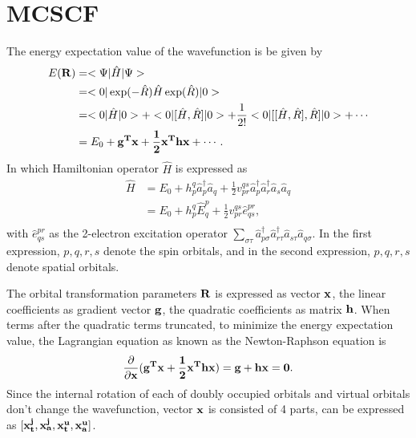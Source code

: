 \documentclass[a4paper,12pt,oneside]{book}
\begin{document}
\section{MCSCF}
The energy expectation value of the wavefunction is be given by
\begin{equation}
\begin{aligned}
E(\bf{R}) &= <\Psi|\hat{H}|\Psi> \\
&= <0|\exp(-\hat{R})\hat{H}\exp(\hat{R})|0> \\
&= <0|\hat{H}|0> + <0|[\hat{H},\hat{R}]|0> + \frac{1}{2!}< 0|[[\hat{H},\hat{R}], \hat{R}]|0> + \cdots\\
&= E_0+\bf{g}^T\bf{x} +\frac{1}{2} \bf{x}^T\bf{hx}+ \cdots.\\
\end{aligned}
\end{equation}
In which Hamiltonian operator $\hat{H}$ is expressed as
\begin{equation}
\begin{aligned}
\hat{H} &= E_0 + h^q_p\hat{a}_p^\dagger\hat{a}_q + \frac{1}{2}v^{qs}_{pr}\hat{a}_p^\dagger\hat{a}_r^\dagger\hat{a}_s\hat{a}_q\\
&= E_0 + h^q_p\hat{E}^p_q + \frac{1}{2}v^{qs}_{pr}\hat{e}^{pr}_{qs},\\
\end{aligned}
\end{equation}
with $\hat{e}^{pr}_{qs}$ as the 2-electron excitation operator $\sum_{\sigma\tau}\hat{a}_{p\sigma}^\dagger\hat{a}_{r\tau}^\dagger\hat{a}_{s\tau}\hat{a}_{q\sigma}$.
In the first expression, $p,q,r,s$ denote the spin orbitals, and in the second expression, $p,q,r,s$ denote spatial orbitals.

The orbital transformation parameters $\bf{R}$ is expressed as vector $\bf{x}$, 
the linear coefficients as gradient vector $\bf{g}$, 
the quadratic coefficients as matrix $\bf{h}$. 
When terms after the quadratic terms truncated, 
to minimize the energy expectation value, the Lagrangian equation as known as the Newton-Raphson equation is
\begin{equation}
\frac{\partial}{\partial \bf{x}}(\bf{g}^T\bf{x}+\frac{1}{2}\bf{x}^T\bf{hx})= \bf{g}+\bf{hx} =0.
\end{equation}
Since the internal rotation of each of doubly occupied orbitals and virtual orbitals don't change the wavefunction, 
vector $\bf{x}$ is consisted of 4 parts, can be expressed as $[\bf{x}_t^j,\bf{x}_a^j,\bf{x}_t^u, \bf{x}_a^u]$.
\end{document}
